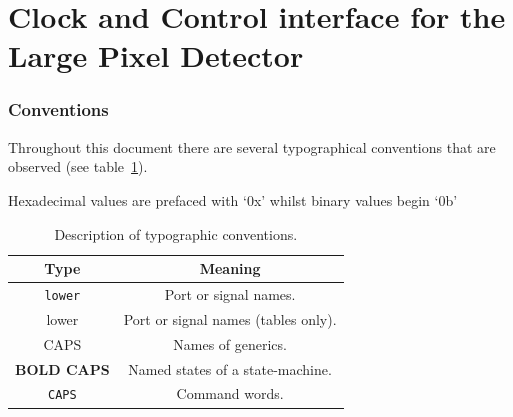 \part{Clock and Control interface for the Large Pixel Detector} %
\label{prt:lpd_ccc_interface}

\section{Conventions} %
\label{sec:conventions}
Throughout this document there are several typographical conventions that are observed (see table~\ref{tab:typography}).

Hexadecimal values are prefaced with `0x' whilst binary values begin `0b' 
\begin{table}
  \begin{center}
  \begin{tabular}{c|c}
    Type               & Meaning                             \\
    \hline                                                   
    \texttt{lower}     & Port or signal names.               \\
    lower              & Port or signal names (tables only). \\
    CAPS               & Names of generics.                  \\
    \textbf{BOLD CAPS} & Named states of a state-machine.    \\
    \texttt{CAPS}      & Command words.                      \\
  \end{tabular}
  \end{center}
  \caption{Description of typographic conventions.}
  \label{tab:typography}
\end{table}
